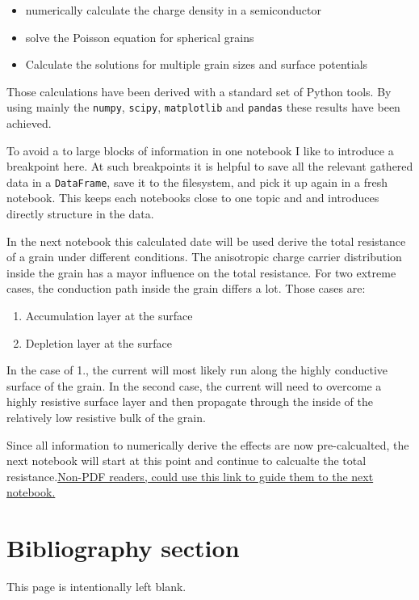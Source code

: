 \documentclass[11pt]{article}
\providecommand{\tightlist}{%
      \setlength{\itemsep}{0pt}\setlength{\parskip}{0pt}}
\begin{document}
\begin{itemize}
\tightlist
\item
  numerically calculate the charge density in a semiconductor
\item
  solve the Poisson equation for spherical grains
\item
  Calculate the solutions for multiple grain sizes and surface
  potentials
\end{itemize}

Those calculations have been derived with a standard set of Python
tools. By using mainly the \texttt{numpy}, \texttt{scipy},
\texttt{matplotlib} and \texttt{pandas} these results have been
achieved.

To avoid a to large blocks of information in one notebook I like to
introduce a breakpoint here. At such breakpoints it is helpful to save
all the relevant gathered data in a \texttt{DataFrame}, save it to the
filesystem, and pick it up again in a fresh notebook. This keeps each
notebooks close to one topic and and introduces directly structure in
the data.

In the next notebook this calculated date will be used derive the total
resistance of a grain under different conditions. The anisotropic charge
carrier distribution inside the grain has a mayor influence on the total
resistance. For two extreme cases, the conduction path inside the grain
differs a lot. Those cases are:

\begin{enumerate}
\def\labelenumi{\arabic{enumi}.}
\tightlist
\item
  Accumulation layer at the surface
\item
  Depletion layer at the surface
\end{enumerate}

In the case of 1., the current will most likely run along the highly
conductive surface of the grain. In the second case, the current will
need to overcome a highly resistive surface layer and then propagate
through the inside of the relatively low resistive bulk of the grain.

Since all information to numerically derive the effects are now
pre-calcualted, the next notebook will start at this point and continue
to calcualte the total
resistance.\href{./3-Resistance-sensor.ipynb}{Non-PDF readers, could use
this link to guide them to the next notebook.}

    \hypertarget{bibliography-section}{%
\section{Bibliography section}\label{bibliography-section}}

    


    \newpage

This page is intentionally left blank.


    
    
    
\end{document}
